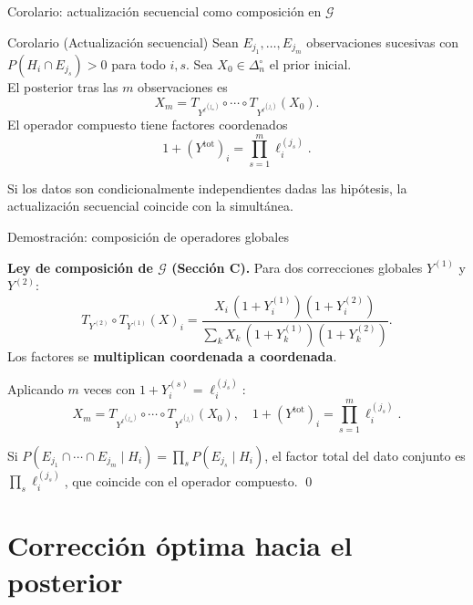 \documentclass[12pt, aspectratio=169]{beamer}
\newcommand{\Dni}{\Delta_n^\circ}
\begin{document}
\begin{frame}{Corolario: actualización secuencial como composición en $\mathcal{G}$}

  \begin{alertblock}{Corolario (Actualización secuencial)}
    Sean $E_{j_1}, \dots, E_{j_m}$ observaciones sucesivas con
    $P(H_i \cap E_{j_s}) > 0$ para todo $i, s$.
    Sea $X_0 \in \Dni$ el prior inicial.\\[6pt]
    El posterior tras las $m$ observaciones es
    \[
      X_m = T_{Y^{\ell^{(j_m)}}} \circ \cdots \circ T_{Y^{\ell^{(j_1)}}}(X_0).
    \]
    El operador compuesto tiene factores coordenados
    \[
      1 + (Y^{\mathrm{tot}})_i = \prod_{s=1}^m \ell_i^{(j_s)}.
    \]
  \end{alertblock}

  \vspace{4pt}
  \small Si los datos son condicionalmente independientes dadas las hipótesis,
  la actualización secuencial coincide con la simultánea.
\end{frame}

\begin{frame}{Demostración: composición de operadores globales}

  \textbf{Ley de composición de $\mathcal{G}$ (Sección C).}
  Para dos correcciones globales $Y^{(1)}$ y $Y^{(2)}$:
  \[
    T_{Y^{(2)}} \circ T_{Y^{(1)}}(X)_i
    = \frac{X_i\,(1+Y_i^{(1)})(1+Y_i^{(2)})}{\displaystyle\sum_{k} X_k\,(1+Y_k^{(1)})(1+Y_k^{(2)})}.
  \]
  Los factores se \textbf{multiplican coordenada a coordenada}.

  \vspace{10pt}
  Aplicando $m$ veces con $1 + Y_i^{(s)} = \ell_i^{(j_s)}$:
  \[
    X_m = T_{Y^{\ell^{(j_m)}}} \circ \cdots \circ T_{Y^{\ell^{(j_1)}}}(X_0),
    \quad
    1 + (Y^{\mathrm{tot}})_i = \prod_{s=1}^m \ell_i^{(j_s)}.
  \]

  \vspace{4pt}
  \small Si $P(E_{j_1} \cap \cdots \cap E_{j_m} \mid H_i) = \prod_s P(E_{j_s} \mid H_i)$,
  el factor total del dato conjunto es $\prod_s \ell_i^{(j_s)}$,
  que coincide con el operador compuesto. \qed
\end{frame}

\section{Corrección óptima hacia el posterior}
\end{document}

